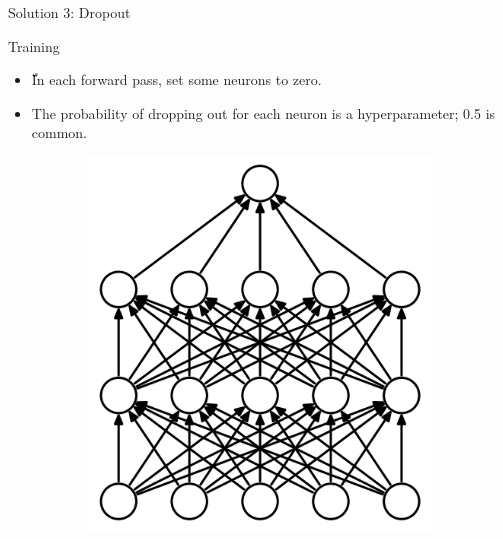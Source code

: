 \begin{frame}{Solution 3: Dropout}
	\begin{block}{Training}
		\begin{itemize}
			\item ّIn each forward pass,  set some neurons to zero.
			\medskip
			\item The probability of dropping out for each neuron is a hyperparameter; 0.5 is common.
		\end{itemize}
		
		\begin{figure}[H]
			\centering
			\begin{subfigure}[b]{0.45\textwidth}
				\centering
				\includegraphics[height=0.4\textheight]{Figs/Dropout-before.png}
			\end{subfigure}
			\begin{subfigure}[b]{0.45\textwidth}
				\centering

\end{subfigure}
\end{figure}
\end{block}
\end{frame}
